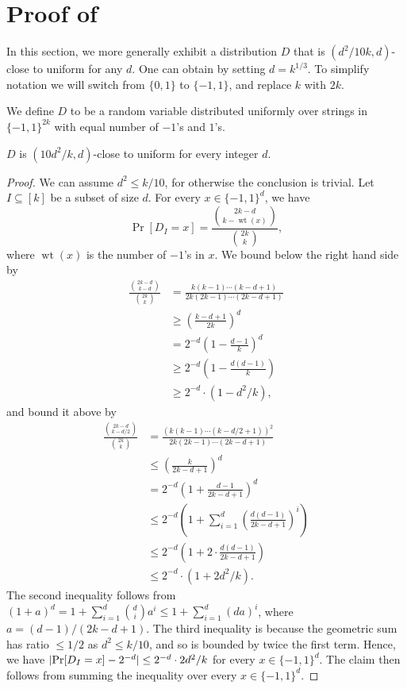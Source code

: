 \documentclass{toc}
\newcommand{\zo}{\{0,1\}}
\def\pmone{\{-1, 1\}}
\DeclarePairedDelimiter{\abs}{\lvert}{\rvert}
\DeclareMathOperator{\wtt}{wt}  %
\begin{document}
\section{Proof of } \label{s-counterex}
In this section, we more generally exhibit a distribution $D$ that is $(d^2/10k,d)$-close to uniform for any $d$.
One can obtain  by setting $d = k^{1/3}$.
 To simplify notation we will switch from $\zo$ to $\pmone$, and replace $k$ with $2k$.

 We define $D$ to be a random variable distributed uniformly over strings in $\pmone^{2k}$ with equal number of $-1$'s and $1$'s.
  \begin{claim}
    $D$ is $(10 d^2 / k, d)$-close to uniform for every integer $d$.
  \end{claim}
  \begin{proof}
    We can assume $d^2 \le k/10$, for otherwise the conclusion is trivial.
    Let $I \subseteq [k]$ be a subset of size $d$.
    For every $x \in \pmone^d$, we have
    \[
      \Pr[D_I = x] = \frac{\binom{2k - d}{k - 
          \wtt(x)  %
  }}{\binom{2k}{k}} ,
    \]
    where
    $\wtt(x)$  %
    is the number of $-1$'s in $x$.
    We bound below the right hand side by
    \begin{align*}
      \frac{\binom{2k - d}{k - d}}{\binom{2k}{k}}
      &= \frac{k (k-1) \cdots (k - d + 1)}{2k (2k - 1) \cdots (2k - d + 1)} \\
      &\ge \left( \frac{k - d + 1}{2k} \right)^d \\
      &= 2^{-d} \left(1 - \frac{d - 1}{k} \right)^d \\
      &\ge 2^{-d} \left(1 - \frac{d (d - 1)}{k} \right) \\
      &\ge 2^{-d} \cdot (1 - d^2 / k),
    \end{align*}
    and bound it above by
    \begin{align*}
      \frac{\binom{2k - d}{k - d/2}}{\binom{2k}{k}}
      &= \frac{(k (k-1) \cdots (k - d/2 + 1))^2}{2k(2k - 1) \cdots (2k - d + 1)} \\
      &\le \left( \frac{k}{2k - d + 1} \right)^d \\
      &= 2^{-d} \left(1 + \frac{d-1}{2k - d + 1} \right)^d \\
      &\le 2^{-d} \left( 1 + \sum_{i=1}^d \left( \frac{d(d-1)}{2k - d + 1} \right)^i \right) \\
      &\le 2^{-d} \left( 1 + 2 \cdot \frac{d(d-1)}{2k - d + 1} \right) \\
      &\le 2^{-d} \cdot ( 1 + 2 d^2 / k) .
    \end{align*}
    The second inequality follows from $(1 + a)^d = 1 + \sum_{i=1}^d \binom{d}{i} a^i \le 1 + \sum_{i=1}^d (da)^i$, where $a = (d-1)/(2k-d+1)$.
    The third inequality is because the geometric sum has ratio $\le 1/2$ as $d^2 \le k/10$, and so is bounded by twice the first term.
    Hence, we have $\abs{\Pr[D_I = x] - 2^{-d}} \le 2^{-d} \cdot 2d^2 / k$ for every $x \in \pmone^d$.
    The claim then follows from summing the inequality over every $x \in \pmone^d$.
  \end{proof}
\end{document}
